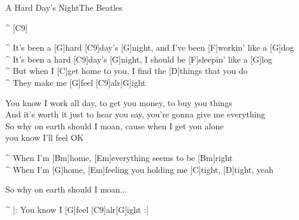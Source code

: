 \begin{song}{A Hard Day's Night}{The Beatles}

\begin{guitar}
^ [C9]\\

\end{guitar}
\begin{guitar}
^ It's been a [G]hard [C9]day's [G]night, and I've been [F]workin' like a [G]dog\\
^ It's been a hard [C9]day's [G]night, I should be [F]sleepin' like a [G]log\\
^ But when I [C]get home to you, I find the [D]things that you do\\
^ They make me [G]feel [C9]alr[G]ight\\
\end{guitar}


\begin{guitar}
You know I work all day, to get you money, to buy you things\\
And it's worth it just to hear you say, you're gonna give me everything\\
So why on earth should I moan, cause when I get you alone \\
you know I'll feel OK\\
\end{guitar}

\begin{guitar}
^ When I'm [Bm]home, [Em]everything seems to be [Bm]right\\
^ When I'm [G]home, [Em]feeling you holding me [C]tight, [D]tight, yeah\\
\end{guitar}



\begin{guitar}
So why on earth should I moan...\\
\end{guitar}



\begin{guitar}
^ |: You know I [G]feel [C9]alr[G]ight :|\\
\end{guitar}

\end{song}
